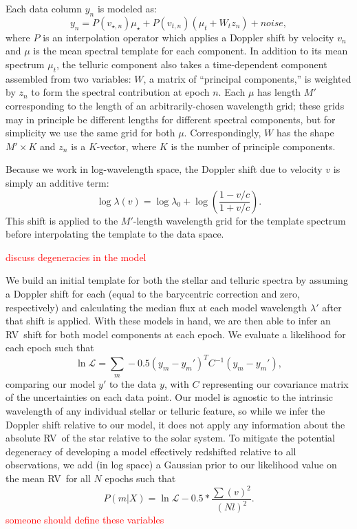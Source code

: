 \documentclass[twocolumn]{aastex62}
\newcommand{\todo}[1]{\textcolor{red}{#1}}  %
\newcommand{\acronym}[1]{{\small{#1}}}
\newcommand{\RV}{\acronym{RV}}
\begin{document}
Each data column $y_n$ is modeled as:
$$y_n = P(v_{\star, n}) \mu_{\star} + P(v_{t, n}) (  \mu_{t} + W_{t} z_n ) + noise,$$
where $P$ is an interpolation operator which applies a Doppler shift by velocity $v_n$ and $\mu$ is the mean spectral template for each component.  In addition to its mean spectrum $\mu_t$, the telluric component also takes a time-dependent component assembled from two variables: $W$, a matrix of ``principal components,'' is weighted by $z_n$ to form the spectral contribution at epoch $n$. Each $\mu$ has length $M'$ corresponding to the length of an arbitrarily-chosen wavelength grid; these grids may in principle be different lengths for different spectral components, but for simplicity we use the same grid for both $\mu$. Correspondingly, $W$ has the shape $M' \times K$ and $z_n$ is a $K$-vector, where $K$ is the number of principle components. 

Because we work in log-wavelength space, the Doppler shift due to velocity $v$ is simply an additive term:
$$ \log \lambda(v) = \log \lambda_{0} + \log \left(\frac{1 - v/c}{1 + v/c}\right).
$$
This shift is applied to the $M'$-length wavelength grid for the template spectrum before interpolating the template to the data space.

\todo{discuss degeneracies in the model}

We build an initial template for both the stellar and telluric spectra by assuming a Doppler shift for each (equal to the barycentric correction and zero, respectively) and calculating the median flux at each model wavelength $\lambda'$ after that shift is applied.
With these models in hand, we are then able to infer an \RV\ shift for both model components at each epoch.
We evaluate a likelihood for each epoch such that
$$ \ln \mathcal{L} = \sum_{m} -0.5 (y_m - y_m')^T C^{-1} (y_m-y_m'),
$$
comparing our model $y'$ to the data $y$, with $C$ representing our covariance matrix of the uncertainties on each data point.
Our model is agnostic to the intrinsic wavelength of any individual stellar or telluric feature, so while we infer the  Doppler shift relative to our model, it does not apply any information about the absolute \RV\ of the star relative to the solar system. 
To mitigate the potential degeneracy of developing a model effectively redshifted relative to all observations, we add (in log space) a Gaussian prior to our likelihood value on the mean \RV\ for all $N$ epochs such that
$$ P(m|X) = \ln \mathcal{L}  -0.5 * \frac{\sum(v)^2}{(Nl)^2}.
$$
\todo{someone should define these variables}
\end{document}

